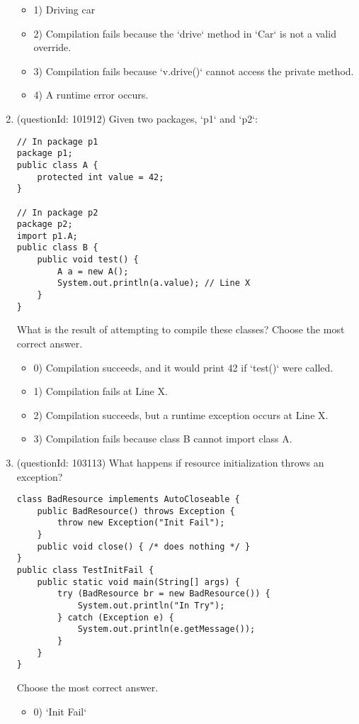 \documentclass[12pt]{article}
\begin{document}
\begin{enumerate}[label=(\arabic*)]
\begin{itemize}
\item 1) Driving car

\item 2) Compilation fails because the `drive` method in `Car` is not a valid override.

\item 3) Compilation fails because `v.drive()` cannot access the private method.

\item 4) A runtime error occurs.

\end{itemize}
\item (questionId: 101912) Given two packages, `p1` and `p2`:
\begin{verbatim}
// In package p1
package p1;
public class A {
    protected int value = 42;
}

// In package p2
package p2;
import p1.A;
public class B {
    public void test() {
        A a = new A();
        System.out.println(a.value); // Line X
    }
}
\end{verbatim}
What is the result of attempting to compile these classes?
Choose the most correct answer. 
\begin{itemize}
\item 0) Compilation succeeds, and it would print 42 if `test()` were called.

\item 1) Compilation fails at Line X.

\item 2) Compilation succeeds, but a runtime exception occurs at Line X.

\item 3) Compilation fails because class B cannot import class A.

\end{itemize}
\item (questionId: 103113) What happens if resource initialization throws an exception?
\begin{verbatim}
class BadResource implements AutoCloseable {
    public BadResource() throws Exception {
        throw new Exception("Init Fail");
    }
    public void close() { /* does nothing */ }
}
public class TestInitFail {
    public static void main(String[] args) {
        try (BadResource br = new BadResource()) {
            System.out.println("In Try");
        } catch (Exception e) {
            System.out.println(e.getMessage());
        }
    }
}
\end{verbatim}
Choose the most correct answer. 
\begin{itemize}
\item 0) `Init Fail`


\end{itemize}
\end{enumerate}
\end{document}
